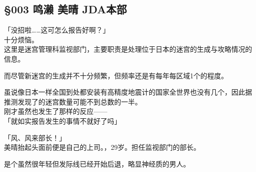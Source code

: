 \subsection{§003 鸣濑 美晴 JDA本部}

「没招啦……这可怎么报告好啊？」\\

十分烦恼。\\

这里是迷宫管理科监视部门，主要职责是处理位于日本的迷宫的生成与攻略情况的信息。

而尽管新迷宫的生成并不十分频繁，但频率还是有每年每区域1个的程度。

虽说像日本一样全国到处都安装有高精度地震计的国家全世界也没有几个，因此据推测发现了的迷宫数量可能不到总数的一半。\\

刚才虽然也发生了那样的反应——\\

「就如实报告发生的事情不就好了吗」

「风、风来部长！」\\

美晴抬起头面前便是自己的上司。，29岁。担任监视部门的部长。

是个虽然很年轻但发际线已经开始后退，略显神经质的男人。\\

